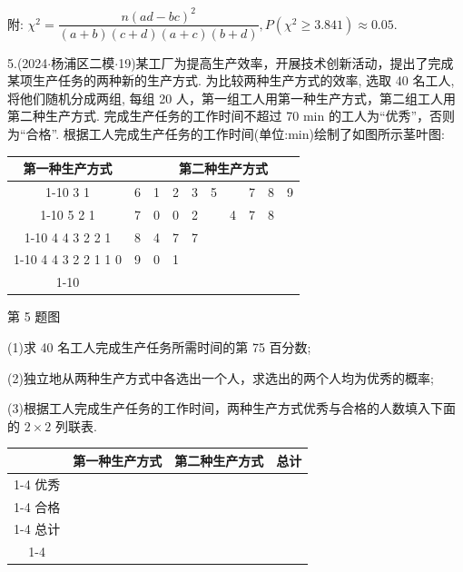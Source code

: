 附: ${\chi }^{2} = \dfrac{n{\left( ad - bc\right) }^{2}}{\left( {a + b}\right) \left( {c + d}\right) \left( {a + c}\right) \left( {b + d}\right) },P\left( {{\chi }^{2} \geq  {3.841}}\right)  \approx  {0.05}$.

5.(2024$\cdot$杨浦区二模$\cdot$19)某工厂为提高生产效率，开展技术创新活动，提出了完成某项生产任务的两种新的生产方式. 为比较两种生产方式的效率, 选取 40 名工人, 将他们随机分成两组, 每组 20 人，第一组工人用第一种生产方式，第二组工人用第二种生产方式. 完成生产任务的工作时间不超过 70 min 的工人为“优秀”，否则为“合格”. 根据工人完成生产任务的工作时间(单位:min)绘制了如图所示茎叶图:

\begin{center}

\begin{tabular}{|c|c|c|c|c|c|c|c|c|c|}
\hline
第一种生产方式 & \phantom{X} & \multicolumn{8}{|c|}{第二种生产方式} \\
\cline{1-10}
3 1 & 6 & 1 & 2 & 3 & 5 & \phantom{X} & 7 & 8 & 9 \\
\cline{1-10}
5 2 1 & 7 & 0 & 0 & 2 & \phantom{X} & 4 & 7 & 8 & \phantom{X} \\
\cline{1-10}
4 4 3 2 2 1 & 8 & 4 & 7 & 7 & \phantom{X} & \phantom{X} & \phantom{X} & \phantom{X} & \phantom{X} \\
\cline{1-10}
4 4 3 2 2 1 1 0 & 9 & 0 & 1 & \phantom{X} & \phantom{X} & \phantom{X} & \phantom{X} & \phantom{X} & \phantom{X} \\
\cline{1-10}
\hline
\end{tabular}
\end{center}

第 5 题图

(1)求 40 名工人完成生产任务所需时间的第 75 百分数;

(2)独立地从两种生产方式中各选出一个人，求选出的两个人均为优秀的概率;

(3)根据工人完成生产任务的工作时间，两种生产方式优秀与合格的人数填入下面的 $2 \times  2$ 列联表.

\begin{center}

\begin{tabular}{|c|c|c|c|}
\hline
\phantom{X} & 第一种生产方式 & 第二种生产方式 & 总计 \\
\cline{1-4}
优秀 & \phantom{X} & \phantom{X} & \phantom{X} \\
\cline{1-4}
合格 & \phantom{X} & \phantom{X} & \phantom{X} \\
\cline{1-4}
总计 & \phantom{X} & \phantom{X} & \phantom{X} \\
\cline{1-4}
\hline
\end{tabular}
\end{center}

